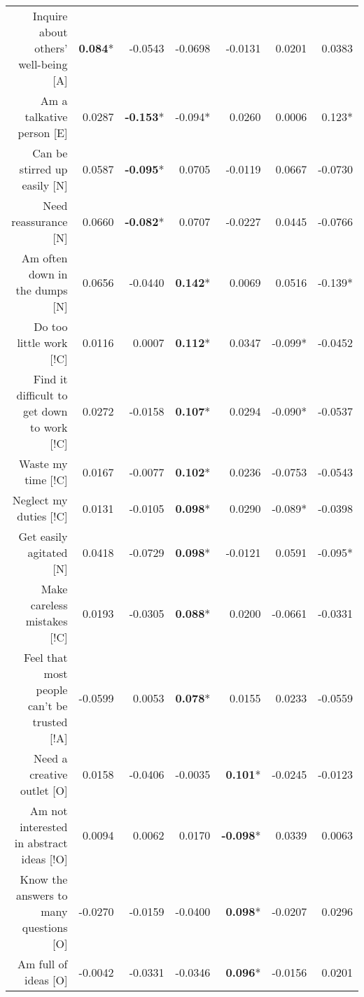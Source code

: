 {\begin{tabular}{rrrrrrr}
Inquire about others' well-being [A]                      & \textbf{0.084}* &-0.0543 &-0.0698 &-0.0131 & 0.0201 & 0.0383\\
Am a talkative person [E]                                 & 0.0287 &\textbf{-0.153}* &-0.094* & 0.0260 & 0.0006 & 0.123*\\
Can be stirred up easily [N]                              & 0.0587 &\textbf{-0.095}* & 0.0705 &-0.0119 & 0.0667 &-0.0730\\
Need reassurance [N]                                      & 0.0660 &\textbf{-0.082}* & 0.0707 &-0.0227 & 0.0445 &-0.0766\\
Am often down in the dumps [N]                            & 0.0656 &-0.0440 & \textbf{0.142}* & 0.0069 & 0.0516 &-0.139*\\
Do too little work [!C]                                   & 0.0116 & 0.0007 & \textbf{0.112}* & 0.0347 &-0.099* &-0.0452\\
Find it difficult to get down to work [!C]                & 0.0272 &-0.0158 & \textbf{0.107}* & 0.0294 &-0.090* &-0.0537\\
Waste my time [!C]                                        & 0.0167 &-0.0077 & \textbf{0.102}* & 0.0236 &-0.0753 &-0.0543\\
Neglect my duties [!C]                                    & 0.0131 &-0.0105 & \textbf{0.098}* & 0.0290 &-0.089* &-0.0398\\
Get easily agitated [N]                                   & 0.0418 &-0.0729 & \textbf{0.098}* &-0.0121 & 0.0591 &-0.095*\\
Make careless mistakes [!C]                               & 0.0193 &-0.0305 & \textbf{0.088}* & 0.0200 &-0.0661 &-0.0331\\
Feel that most people can't be trusted [!A]               &-0.0599 & 0.0053 & \textbf{0.078}* & 0.0155 & 0.0233 &-0.0559\\
Need a creative outlet [O]                                & 0.0158 &-0.0406 &-0.0035 & \textbf{0.101}* &-0.0245 &-0.0123\\
Am not interested in abstract ideas [!O]                  & 0.0094 & 0.0062 & 0.0170 &\textbf{-0.098}* & 0.0339 & 0.0063\\
Know the answers to many questions [O]                    &-0.0270 &-0.0159 &-0.0400 & \textbf{0.098}* &-0.0207 & 0.0296\\
Am full of ideas [O]                                      &-0.0042 &-0.0331 &-0.0346 & \textbf{0.096}* &-0.0156 & 0.0201\\

\end{tabular}}
